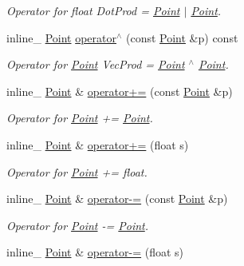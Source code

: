 \begin{DoxyCompactItemize}
\begin{DoxyCompactList}\small\item\em Operator for float Dot\+Prod = \hyperlink{classPoint}{Point} $\vert$ \hyperlink{classPoint}{Point}. \end{DoxyCompactList}\item 
inline\+\_\+ \hyperlink{classPoint}{Point} \hyperlink{classPoint_a54def8e38ec141a5f163a460dd270af2}{operator$^\wedge$} (const \hyperlink{classPoint}{Point} \&p) const \hypertarget{classPoint_a54def8e38ec141a5f163a460dd270af2}{}\label{classPoint_a54def8e38ec141a5f163a460dd270af2}

\begin{DoxyCompactList}\small\item\em Operator for \hyperlink{classPoint}{Point} Vec\+Prod = \hyperlink{classPoint}{Point} $^\wedge$ \hyperlink{classPoint}{Point}. \end{DoxyCompactList}\item 
inline\+\_\+ \hyperlink{classPoint}{Point} \& \hyperlink{classPoint_ad85cea8275d83302dc3bf029fd89aa9e}{operator+=} (const \hyperlink{classPoint}{Point} \&p)\hypertarget{classPoint_ad85cea8275d83302dc3bf029fd89aa9e}{}\label{classPoint_ad85cea8275d83302dc3bf029fd89aa9e}

\begin{DoxyCompactList}\small\item\em Operator for \hyperlink{classPoint}{Point} += \hyperlink{classPoint}{Point}. \end{DoxyCompactList}\item 
inline\+\_\+ \hyperlink{classPoint}{Point} \& \hyperlink{classPoint_ad3f8a46f565112f45501056100a33859}{operator+=} (float s)\hypertarget{classPoint_ad3f8a46f565112f45501056100a33859}{}\label{classPoint_ad3f8a46f565112f45501056100a33859}

\begin{DoxyCompactList}\small\item\em Operator for \hyperlink{classPoint}{Point} += float. \end{DoxyCompactList}\item 
inline\+\_\+ \hyperlink{classPoint}{Point} \& \hyperlink{classPoint_acc235529c6962a30a1a3a34064285209}{operator-\/=} (const \hyperlink{classPoint}{Point} \&p)\hypertarget{classPoint_acc235529c6962a30a1a3a34064285209}{}\label{classPoint_acc235529c6962a30a1a3a34064285209}

\begin{DoxyCompactList}\small\item\em Operator for \hyperlink{classPoint}{Point} -\/= \hyperlink{classPoint}{Point}. \end{DoxyCompactList}\item 
inline\+\_\+ \hyperlink{classPoint}{Point} \& \hyperlink{classPoint_a4d9ff74b025a509d29eb0a241150b67e}{operator-\/=} (float s)\hypertarget{classPoint_a4d9ff74b025a509d29eb0a241150b67e}{}\label{classPoint_a4d9ff74b025a509d29eb0a241150b67e}


\end{DoxyCompactItemize}
